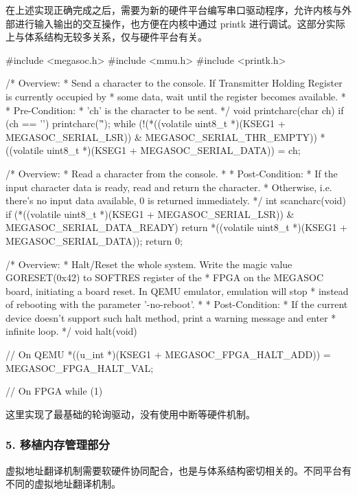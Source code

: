 在上述实现正确完成之后，需要为新的硬件平台编写串口驱动程序，允许内核与外部进行输入输出的交互操作，也方便在内核中通过 printk 进行调试。这部分实际上与体系结构无较多关系，仅与硬件平台有关。

\begin{CodeBlock}[language=BookC]
#include <megasoc.h>
#include <mmu.h>
#include <printk.h>

/* Overview:
 *   Send a character to the console. If Transmitter Holding Register is currently occupied by
 *   some data, wait until the register becomes available.
 *
 * Pre-Condition:
 *   'ch' is the character to be sent.
 */
void printcharc(char ch) {
    if (ch == '\n') {
        printcharc('\r');
    }
    while (!(*((volatile uint8_t *)(KSEG1 + MEGASOC_SERIAL_LSR)) & MEGASOC_SERIAL_THR_EMPTY)) {
    }
    *((volatile uint8_t *)(KSEG1 + MEGASOC_SERIAL_DATA)) = ch;
}

/* Overview:
 *   Read a character from the console.
 *
 * Post-Condition:
 *   If the input character data is ready, read and return the character.
 *   Otherwise, i.e. there's no input data available, 0 is returned immediately.
 */
int scancharc(void) {
    if (*((volatile uint8_t *)(KSEG1 + MEGASOC_SERIAL_LSR)) & MEGASOC_SERIAL_DATA_READY) {
        return *((volatile uint8_t *)(KSEG1 + MEGASOC_SERIAL_DATA));
    }
    return 0;
}

/* Overview:
 *   Halt/Reset the whole system. Write the magic value GORESET(0x42) to SOFTRES register of the
 *   FPGA on the MEGASOC board, initiating a board reset. In QEMU emulator, emulation will stop
 *   instead of rebooting with the parameter '-no-reboot'.
 *
 * Post-Condition:
 *   If the current device doesn't support such halt method, print a warning message and enter
 *   infinite loop.
 */
void halt(void) {
    // On QEMU
    *((u_int *)(KSEG1 + MEGASOC_FPGA_HALT_ADD)) = MEGASOC_FPGA_HALT_VAL;

    // On FPGA
    while (1) {
    }
}

\end{CodeBlock}

这里实现了最基础的轮询驱动，没有使用中断等硬件机制。

\subsubsection{5. 移植内存管理部分}\label{sec:13-operating-system-007}

虚拟地址翻译机制需要软硬件协同配合，也是与体系结构密切相关的。不同平台有不同的虚拟地址翻译机制。

